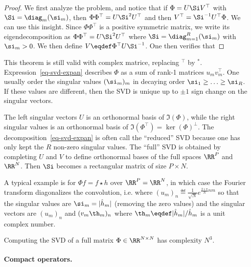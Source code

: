 \begin{proof}
	We first analyze the problem, and notice that if $\Phi = U \Si V^\top$ with $\Si = \diag_m(\si_m)$, then 
	$\Phi\Phi^\top=U \Si^2 U^\top$ and then $V^\top = \Si^{-1} U^\top \Phi$.
	We can use this insight. Since $\Phi\Phi^\top$ is a positive symmetric matrix, we write its eigendecomposition as $\Phi\Phi^\top=U \Si^2 U^\top$ where $\Si = \diag_{m=1}^R(\si_m)$ with $\si_m>0$. We then define $V \eqdef \Phi^\top U \Si^{-1}$.
	One then verifies that 
\end{proof}

This theorem is still valid with complex matrice, replacing $^\top$ by $^*$.
%
Expression~\eqref{eq-svd-expan} describes $\Phi$ as a sum of rank-1 matrices $u_m v_m^\top$.
%
One usually order the singular values $(\si_m)_m$ in decaying order $\si_1 \geq \ldots \geq \si_R$. If these values are different, then the SVD is unique up to $\pm 1$ sign change on the singular vectors.  

The left singular vectors $U$ is an orthonormal basis of $\Im(\Phi)$, while the right singular values is an orthonormal basis of $\Im(\Phi^\top)=\ker(\Phi)^\bot$.
%
The decomposition~\eqref{eq-svd-expan} is often call the ``reduced'' SVD because one has only kept the $R$ non-zero singular values.
The ``full'' SVD is obtained by completing $U$ and $V$ to define orthonormal bases of the full spaces $\RR^P$ and $\RR^N$. Then $\Si$ becomes a rectangular matrix of size $P\times N$.

A typical example is for $\Phi f=f \star h$ over $\RR^P=\RR^N$, in which case the Fourier transform diagonalizes the convolution, i.e.
where $(u_m)_n \eqdef \frac{1}{\sqrt{N}}e^{\frac{2\imath\pi}{N}nm}$ so that the singular values are $\si_m=|\hat h_m|$ (removing the zero values) and the singular vectors are $(u_m)_n$ and $(v_m \th_m)_n$ where $\th_m \eqdef |\hat h_m|/\hat h_m$ is a unit complex number. 

Computing the SVD of a full matrix $\Phi \in \RR^{N \times N}$ has complexity $N^3$. 

\paragraph{Compact operators.}

